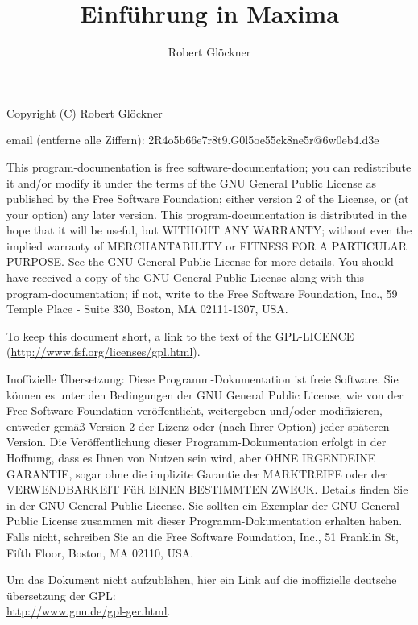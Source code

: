 \documentclass[12pt]{scrartcl}
\title{Einführung in Maxima}
\author{Robert Glöckner}
\begin{document}
\maketitle

\tableofcontents

\newpage
\thispagestyle{empty}
Copyright (C) Robert Glöckner

email (entferne alle Ziffern): 2R4o5b66e7r8t9.G0l5oe55ck8ne5r@6w0eb4.d3e

\vspace{1cm}

{\scriptsize
This program-documentation is free software-documentation; you can redistribute it and/or modify it under the terms of the GNU General Public License as published by the Free Software Foundation; either version 2 of the License, or (at your option) any later version.
This program-documentation is distributed in the hope that it will be useful, but WITHOUT ANY WARRANTY; without even the implied warranty of MERCHANTABILITY or FITNESS FOR A PARTICULAR PURPOSE\@. See the GNU General Public License for more details.
You should have received a copy of the GNU General Public License along with this program-documentation; if not, write to the Free Software Foundation, Inc., 59 Temple Place - Suite 330, Boston, MA 02111-1307, USA.

To keep this document short, a link to the text of the GPL-LICENCE (\url{http://www.fsf.org/licenses/gpl.html}).

\vspace{1cm}

Inoffizielle Übersetzung: Diese Programm-Dokumentation ist freie Software. Sie können es unter den Bedingungen der GNU General Public License, wie von der Free Software Foundation veröffentlicht, weitergeben und/oder modifizieren, entweder gemäß Version 2 der Lizenz oder (nach Ihrer Option) jeder späteren Version.
Die Veröffentlichung dieser Programm-Dokumentation erfolgt in der Hoffnung, dass es Ihnen von Nutzen sein wird, aber OHNE IRGENDEINE GARANTIE, sogar ohne die implizite Garantie der MARKTREIFE oder der VERWENDBARKEIT FüR EINEN BESTIMMTEN ZWECK\@. Details finden Sie in der GNU General Public License.
Sie sollten ein Exemplar der GNU General Public License zusammen mit dieser Programm-Dokumentation erhalten haben. Falls nicht, schreiben Sie an die Free Software Foundation, Inc., 51 Franklin St, Fifth Floor, Boston, MA 02110, USA.

Um das Dokument nicht aufzublähen, hier ein Link auf die inoffizielle
deutsche übersetzung der GPL:\\
\url{http://www.gnu.de/gpl-ger.html}.
}
\end{document}
